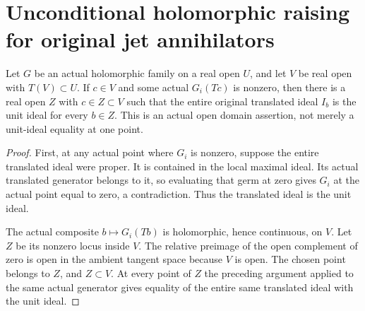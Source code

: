 \section{Unconditional holomorphic raising for original jet annihilators}

\begin{theorem}
\label{hir:actual-nonzero-generator-open-unit-ideal-domain}
\leanok
Let $G$ be an actual holomorphic family on a real open $U$, and let
$V$ be real open with $T(V)\subset U$. If $c\in V$ and some actual
$G_i(Tc)$ is nonzero, then there is a real open $Z$ with
$c\in Z\subset V$ such that the entire original translated ideal
$I_b$ is the unit ideal for every $b\in Z$. This is an actual open
domain assertion, not merely a unit-ideal equality at one point.
\end{theorem}
\begin{proof}
First, at any actual point where $G_i$ is nonzero, suppose the entire
translated ideal were proper. It is contained in the local maximal
ideal. Its actual translated generator belongs to it, so evaluating
that germ at zero gives $G_i$ at the actual point equal to zero,
a contradiction. Thus the translated ideal is the unit ideal.

The actual composite $b\mapsto G_i(Tb)$ is holomorphic, hence
continuous, on $V$. Let $Z$ be its nonzero locus inside $V$. The
relative preimage of the open complement of zero is open in the
ambient tangent space because $V$ is open. The chosen point belongs
to $Z$, and $Z\subset V$. At every point of $Z$ the preceding
argument applied to the same actual generator gives equality of the
entire same translated ideal with the unit ideal.
\end{proof}

